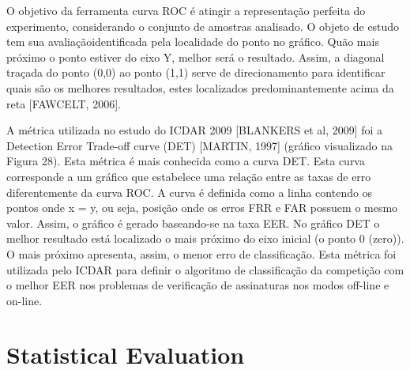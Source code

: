 O objetivo da ferramenta curva ROC é atingir a representação perfeita do experimento,
considerando o conjunto de amostras analisado.
O objeto de estudo tem sua avaliaçãoidentificada pela localidade do ponto no gráfico. Quão mais próximo o ponto estiver do eixo Y,
melhor será o resultado. Assim, a diagonal traçada do ponto (0,0) ao ponto (1,1) serve de
direcionamento para identificar quais são os melhores resultados, estes localizados
predominantemente acima da reta [FAWCELT, 2006]. 

A métrica utilizada no estudo do ICDAR 2009 [BLANKERS et al, 2009] foi a Detection
Error Trade-off curve (DET) [MARTIN, 1997] (gráfico visualizado na Figura 28). Esta métrica
é mais conhecida como a curva DET. Esta curva corresponde a um gráfico que estabelece uma
relação entre as taxas de erro diferentemente da curva ROC. A curva é definida como a linha
contendo os pontos onde x = y, ou seja, posição onde os erros FRR e FAR possuem o mesmo
valor. Assim, o gráfico é gerado baseando-se na taxa EER. No gráfico DET o melhor resultado
está localizado o mais próximo do eixo inicial (o ponto 0 (zero)). O mais próximo apresenta,
assim, o menor erro de classificação. Esta métrica foi utilizada pelo ICDAR para definir o
algoritmo de classificação da competição com o melhor EER nos problemas de verificação de
assinaturas nos modos off-line e on-line.

\section{Statistical Evaluation}



